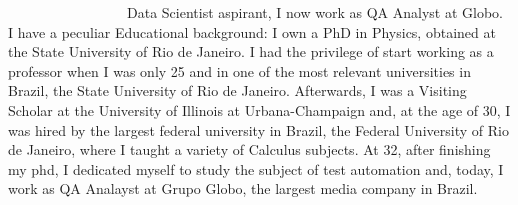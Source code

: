 \documentclass[9pt]{developercv} %
\begin{document}

\ \ \ \ \ \ \ \ \ \ \ \ \ \ \ \ \ Data Scientist aspirant, I now work as QA Analyst at Globo. I have a peculiar Educational background: I own a PhD in Physics, obtained at the State University of Rio de Janeiro. I had the privilege of start working as a professor when I was only 25 and in one of the most relevant universities in Brazil, the State University of Rio de Janeiro. Afterwards, I was a Visiting Scholar at the University of Illinois at Urbana-Champaign and, at the age of 30, I was hired by the largest federal university in Brazil, the Federal University of Rio de Janeiro, where I taught a variety of Calculus subjects. At 32, after finishing my phd, I dedicated myself to study the subject of test automation and, today, I work as QA Analayst at Grupo Globo, the largest media company in Brazil.

\end{document}
